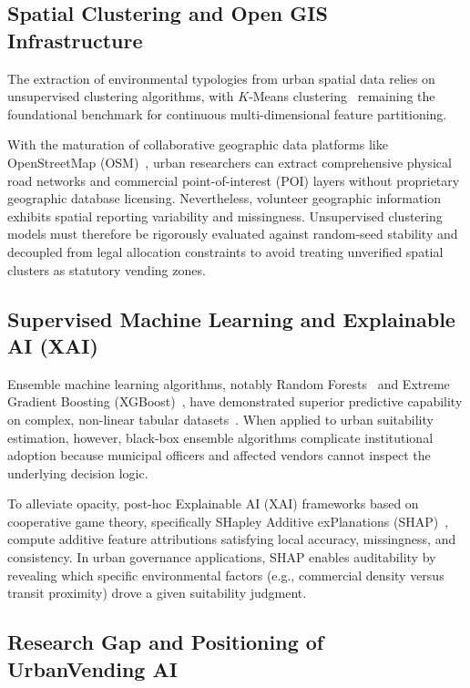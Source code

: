 \subsection{Spatial Clustering and Open GIS Infrastructure}
\label{sec:lit_clustering}

The extraction of environmental typologies from urban spatial data relies on unsupervised clustering algorithms, with $K$-Means clustering~\cite{macqueen1967some, lloyd1982least} remaining the foundational benchmark for continuous multi-dimensional feature partitioning. 

With the maturation of collaborative geographic data platforms like OpenStreetMap (OSM)~\cite{haklay2008openstreetmap}, urban researchers can extract comprehensive physical road networks and commercial point-of-interest (POI) layers without proprietary geographic database licensing. Nevertheless, volunteer geographic information exhibits spatial reporting variability and missingness. Unsupervised clustering models must therefore be rigorously evaluated against random-seed stability and decoupled from legal allocation constraints to avoid treating unverified spatial clusters as statutory vending zones.

\subsection{Supervised Machine Learning and Explainable AI (XAI)}
\label{sec:lit_ml_xai}

Ensemble machine learning algorithms, notably Random Forests~\cite{breiman2001random} and Extreme Gradient Boosting (XGBoost)~\cite{chen2016xgboost}, have demonstrated superior predictive capability on complex, non-linear tabular datasets~\cite{pedregosa2011scikit}. When applied to urban suitability estimation, however, black-box ensemble algorithms complicate institutional adoption because municipal officers and affected vendors cannot inspect the underlying decision logic.

To alleviate opacity, post-hoc Explainable AI (XAI) frameworks based on cooperative game theory, specifically SHapley Additive exPlanations (SHAP)~\cite{lundberg2017unified}, compute additive feature attributions satisfying local accuracy, missingness, and consistency. In urban governance applications, SHAP enables auditability by revealing which specific environmental factors (e.g., commercial density versus transit proximity) drove a given suitability judgment.

\subsection{Research Gap and Positioning of UrbanVending AI}
\label{sec:lit_gap}

